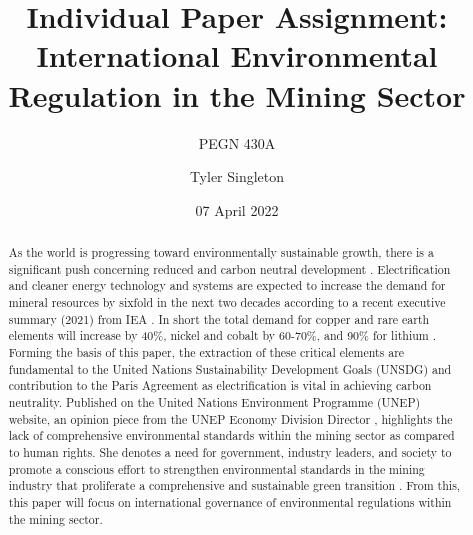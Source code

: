 \documentclass[12pt]{article}
\title{Individual Paper Assignment: \\
    International Environmental Regulation in the Mining Sector}
\subtitle{PEGN 430A}
\author{Tyler Singleton}
\date{07 April 2022}
\begin{document}
\maketitle
\newpage



\doublespacing

\renewcommand{\abstractname}{Introduction}
\begin{abstract}
\normalsize
\noindent
As the world is progressing toward environmentally sustainable growth, there is a significant push concerning reduced and carbon neutral development \cite{Report:IEA_Executive_Summary, News:Environmental_Regulation}. Electrification and cleaner energy technology and systems are expected to increase the demand for mineral resources by sixfold in the next two decades according to a recent executive summary (2021) from IEA \cite{Report:IEA_Executive_Summary}. In short the total demand for copper and rare earth elements will increase by 40\%, nickel and cobalt by 60-70\%, and 90\% for lithium \cite{Report:IEA_Executive_Summary}. Forming the basis of this paper, the extraction of these critical elements are fundamental to the United Nations Sustainability Development Goals (UNSDG) and contribution to the Paris Agreement as electrification is vital in achieving carbon neutrality. Published on the United Nations Environment Programme (UNEP) website, an opinion piece from the UNEP Economy Division Director \cite{News:Environmental_Regulation}, highlights the lack of comprehensive environmental standards within the mining sector as compared to human rights. She denotes a need for government, industry leaders, and society to promote a conscious effort to strengthen environmental standards in the mining industry that proliferate a comprehensive and sustainable green transition \cite{News:Environmental_Regulation}. From this, this paper will focus on international governance of environmental regulations within the mining sector. 
\end{abstract}
\end{document}
